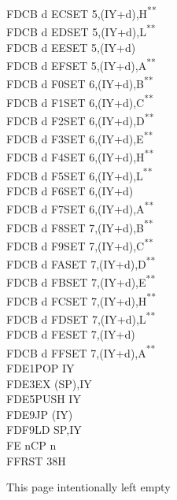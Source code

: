 \documentclass[12pt,twoside,openright,a4paper]{book}
\newcommand{\UNDOC}{\textnormal{\textsuperscript{**}}}
\newcommand{\IntentionallyEmpty}{
	\mbox{}
	\vfill
	\begin{center}
	This page intentionally left empty
	\end{center}
	\vfill
	\mbox{}
}
\begin{document}
\begin{multicols}{3}
{\begin{tabbing}
	FDCB d EC\>SET 5,(IY+d),H\UNDOC\\
	FDCB d ED\>SET 5,(IY+d),L\UNDOC\\
	FDCB d EE\>SET 5,(IY+d)\\
	FDCB d EF\>SET 5,(IY+d),A\UNDOC\\
	FDCB d F0\>SET 6,(IY+d),B\UNDOC\\
	FDCB d F1\>SET 6,(IY+d),C\UNDOC\\
	FDCB d F2\>SET 6,(IY+d),D\UNDOC\\
	FDCB d F3\>SET 6,(IY+d),E\UNDOC\\
	FDCB d F4\>SET 6,(IY+d),H\UNDOC\\
	FDCB d F5\>SET 6,(IY+d),L\UNDOC\\
	FDCB d F6\>SET 6,(IY+d)\\
	FDCB d F7\>SET 6,(IY+d),A\UNDOC\\
	FDCB d F8\>SET 7,(IY+d),B\UNDOC\\
	FDCB d F9\>SET 7,(IY+d),C\UNDOC\\
	FDCB d FA\>SET 7,(IY+d),D\UNDOC\\
	FDCB d FB\>SET 7,(IY+d),E\UNDOC\\
	FDCB d FC\>SET 7,(IY+d),H\UNDOC\\
	FDCB d FD\>SET 7,(IY+d),L\UNDOC\\
	FDCB d FE\>SET 7,(IY+d)\\
	FDCB d FF\>SET 7,(IY+d),A\UNDOC\\
	FDE1\>POP IY\\
	FDE3\>EX (SP),IY\\
	FDE5\>PUSH IY\\
	FDE9\>JP (IY)\\
	FDF9\>LD SP,IY\\
	FE n\>CP n\\
	FF\>RST 38H
\end{tabbing}
}
\end{multicols}
\normalsize

\pagebreak
\IntentionallyEmpty
\pagebreak



\end{document}
